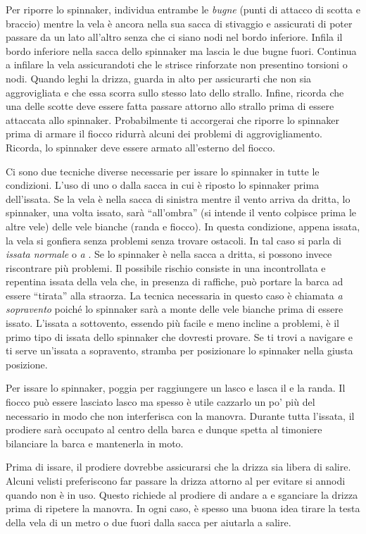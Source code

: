 Per riporre lo spinnaker, individua entrambe le \emph {bugne} (punti di attacco
di scotta e braccio) mentre la vela è ancora nella sua sacca di stivaggio e
assicurati di poter passare da un lato all'altro senza che ci siano nodi nel
bordo inferiore. Infila il bordo inferiore nella sacca dello spinnaker ma lascia
le due bugne fuori. Continua a infilare la vela assicurandoti che le strisce
rinforzate non presentino torsioni o nodi. Quando leghi la drizza, guarda in
alto per assicurarti che non sia aggrovigliata e che essa scorra sullo stesso
lato dello strallo. Infine, ricorda che una delle scotte deve essere fatta
passare attorno allo strallo prima di essere attaccata allo spinnaker.
Probabilmente ti accorgerai che riporre lo spinnaker prima di armare il fiocco
ridurrà alcuni dei problemi di aggrovigliamento. Ricorda, lo spinnaker deve
essere armato all'esterno del fiocco.

Ci sono due tecniche diverse necessarie per issare lo spinnaker in tutte le
condizioni. L'uso di uno o dalla sacca in cui è riposto lo spinnaker prima
dell'issata. Se la vela è nella sacca di sinistra mentre il vento arriva da
dritta, lo spinnaker, una volta issato, sarà ``all'ombra'' (si intende il vento
colpisce prima le altre vele) delle vele bianche (randa e fiocco). In questa
condizione, appena issata, la vela si gonfiera senza problemi senza trovare
ostacoli. In tal caso si parla di \emph{issata normale} o \emph{a \leeward}.
%
Se lo spinnaker è nella sacca a dritta, si possono invece riscontrare più
problemi. Il possibile rischio consiste in una incontrollata e repentina issata
della vela che, in presenza di raffiche, può portare la barca ad essere
``tirata'' alla straorza. La tecnica necessaria in questo caso è chiamata
\emph{a sopravento} poiché lo spinnaker sarà a monte delle vele bianche prima di
essere issato. L'issata a sottovento, essendo più facile e meno incline a
problemi, è il primo tipo di issata dello spinnaker che dovresti provare. Se
ti trovi a navigare e ti serve un'issata a sopravento, stramba per posizionare
lo spinnaker nella giusta posizione.

Per issare lo spinnaker, poggia per raggiungere un lasco e lasca il \vang e la
randa. Il fiocco può essere lasciato lasco ma spesso è utile cazzarlo un po' più
del necessario in modo che non interferisca con la manovra. Durante tutta
l'issata, il prodiere sarà occupato al centro della barca e dunque spetta al
timoniere bilanciare la barca e mantenerla in moto.

Prima di issare, il prodiere dovrebbe assicurarsi che la drizza sia libera di
salire. Alcuni velisti preferiscono far passare la drizza attorno al \chainplate
per evitare si annodi quando non è in uso. Questo richiede al prodiere di andare
a \leeward e sganciare la drizza prima di ripetere la manovra. In ogni caso, è
spesso una buona idea tirare la testa della vela di un metro o due fuori dalla
sacca per aiutarla a salire.

